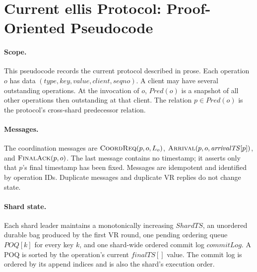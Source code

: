 \newcommand{\opid}[1]{\mathit{id}(#1)}
\newcommand{\keyof}[1]{\mathit{key}(#1)}
\newcommand{\shardof}[1]{\mathit{shard}(#1)}
\newcommand{\preds}[1]{\mathit{Pred}(#1)}
\newcommand{\succs}[1]{\mathit{Succ}(#1)}
\newcommand{\ats}[1]{\mathit{arrivalTS}[#1]}
\newcommand{\fts}[1]{\mathit{finalTS}[#1]}
\newcommand{\poq}[1]{\mathit{POQ}[#1]}
\newcommand{\clog}{\mathit{commitLog}}
\newcommand{\trues}{\textsc{true}}
\newcommand{\false}{\textsc{false}}
\newcommand{\vrone}{\textsc{VR-1}}
\newcommand{\vrtwo}{\textsc{VR-2}}
\newcommand{\Callout}[1]{\Statex\hspace{\algorithmicindent}\textcolor{red!70!black}{\textbf{Open point:} #1}}

\section{Current ellis Protocol: Proof-Oriented Pseudocode}

\paragraph{Scope.}
This pseudocode records the current protocol described in prose.  Each operation
$o$ has data $(\mathit{type},\mathit{key},\mathit{value},\mathit{client},
\mathit{seqno})$.  A client may have several outstanding operations.  At the
invocation of $o$, $\preds{o}$ is a snapshot of all other operations then
outstanding at that client.  The relation $p\in\preds{o}$ is the protocol's
cross-shard predecessor relation.

\paragraph{Messages.}
The coordination messages are
$\textsc{CoordReq}(p,o,L_o)$,
$\textsc{Arrival}(p,o,\ats{p})$, and
$\textsc{FinalAck}(p,o)$.  The last message contains no timestamp; it asserts
only that $p$'s final timestamp has been fixed.  Messages are idempotent and
identified by operation IDs.  Duplicate messages and duplicate VR replies do
not change state.

\paragraph{Shard state.}
Each shard leader maintains a monotonically increasing $\mathit{ShardTS}$, an
unordered durable bag produced by the first VR round, one pending ordering
queue $\poq{k}$ for every key $k$, and one shard-wide ordered commit log
$\clog$.  A POQ is sorted by the operation's current $\fts{}$ value.  The
commit log is ordered by its append indices and is also the shard's execution
order.

